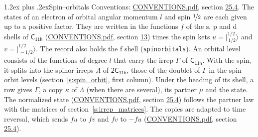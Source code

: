 \documentclass[10pt,a4paper]{article}
\makeatletter
\renewcommand\section{\@startsection{section}{1}{\z@}{-3ex plus -1ex minus -.2ex}%
  {1.2ex plus .2ex}{\normalfont\large\sffamily\bfseries\color{parttitle}}}
\numberwithin{equation}{section}
\newcommand{\grp}[1]{\mathsf{#1}}
\newcommand{\orbital}[1]{\mathrm{#1}}
\newcommand{\mult}{\kappa}
\newcommand{\intx}{\mu}
\newcommand{\jm}[2]{\bigl\lvert{}^{#1}_{\,#2}\bigr\rangle}
\makeatother
\begin{document}
\section{Spin--orbitals}\label{s:spin_orbitals}
Conventions: \href{../../CONVENTIONS.pdf}{CONVENTIONS.pdf}, section \href{../../CONVENTIONS.pdf\#conv.25.4}{25.4}.
\leavevmode\label{n:index.orbital.l}The states of an electron of orbital angular momentum $l$ and spin $\nicefrac{1}{2}$ are each given up to a positive factor. \label{n:local.spinor.uv}\label{n:local.function.f}They are written in the functions $f$ of the $\orbital{s}$, $\orbital{p}$ and $\orbital{d}$ shells of \href{../../../rotation/data/pdf/C11h.pdf}{$\grp{C_{11h}}$} (\href{../../CONVENTIONS.pdf}{CONVENTIONS.pdf}, section \href{../../../rotation/CONVENTIONS.pdf\#conv.13}{13}) times the spin kets $u = \jm{1/2}{1/2}$ and $v = \jm{1/2}{-1/2}$. The record also holds the $\orbital{f}$ shell (\texttt{spinorbitals}). An orbital level consists of the functions of degree $l$ that carry the irrep $\Gamma$ of \href{../../../rotation/data/pdf/C11h.pdf}{$\grp{C_{11h}}$}. With the spin, it splits into the spinor irreps $\Lambda$ of $\grp{2C_{11h}}$, those of the doublet of $\Gamma$ in the spin--orbit levels (section~\ref{s:spin_orbit}, first column). \label{n:head.state}Under the heading of its shell, a row gives $\Gamma$, a copy $\mult$ of $\Lambda$ (when there are several), its partner $\intx$ and the state. The normalized state (\href{../../CONVENTIONS.pdf}{CONVENTIONS.pdf}, section \href{../../CONVENTIONS.pdf\#conv.25.4}{25.4}) follows the partner law with the matrices of section~\ref{s:irrep_matrices}. The copies are adapted to time reversal, which sends $f u$ to $f v$ and $f v$ to $-f u$ (\href{../../CONVENTIONS.pdf}{CONVENTIONS.pdf}, section \href{../../CONVENTIONS.pdf\#conv.25.4}{25.4}).
\end{document}
